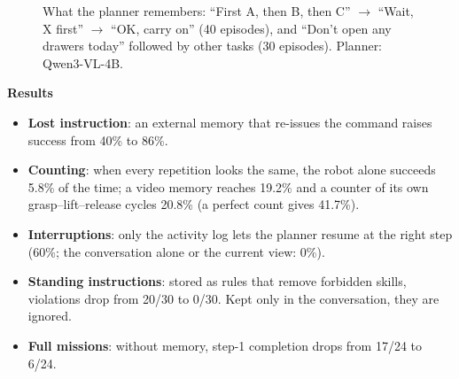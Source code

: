 \documentclass[11pt,a4paper]{article}
\newcommand{\sub}[1]{\par\needspace{4\baselineskip}\smallskip\noindent\textbf{#1}\par}
\begin{document}
\begin{figure}[!htbp]\centering
{}
\caption{What the planner remembers: ``First A, then B, then C'' $\rightarrow$ ``Wait, X first'' $\rightarrow$ ``OK, carry on'' (40 episodes), and ``Don't open any drawers today'' followed by other tasks (30 episodes). Planner: Qwen3-VL-4B.}
\label{fig:mem1}
\end{figure}

\sub{Results}
\begin{itemize}
\item \textbf{Lost instruction}: an external memory that re-issues the command raises success from 40\% to 86\%.
\item \textbf{Counting}: when every repetition looks the same, the robot alone succeeds 5.8\% of the time; a video memory reaches 19.2\% and a counter of its own grasp--lift--release cycles 20.8\% (a perfect count gives 41.7\%).
\item \textbf{Interruptions}: only the activity log lets the planner resume at the right step (60\%; the conversation alone or the current view: 0\%).
\item \textbf{Standing instructions}: stored as rules that remove forbidden skills, violations drop from 20/30 to 0/30. Kept only in the conversation, they are ignored.
\item \textbf{Full missions}: without memory, step-1 completion drops from 17/24 to 6/24.
\end{itemize}
\end{document}

